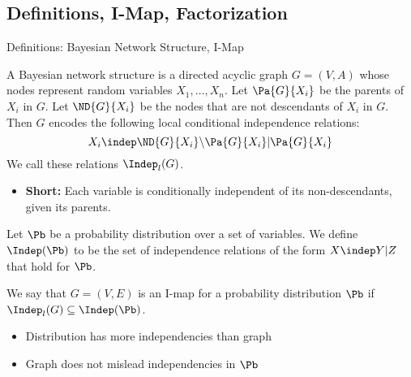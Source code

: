 \subsection{Definitions, I-Map, Factorization}
\begin{frame}{Definitions: Bayesian Network Structure, I-Map}
\begin{definition}
    A Bayesian network structure is a directed acyclic graph $G = (V,A)$ whose nodes represent random variables $X_1,\ldots, X_n$.
    Let $\Pa{G}{X_i}$ be the parents of $X_i$ in $G$.
    Let $\ND{G}{X_i}$ be the nodes that are not descendants of $X_i$ in $G$.
    Then $G$ encodes the following local conditional independence relations:
    \begin{equation}
X_i \indep \ND{G}{X_i} \backslash \Pa{G}{X_i} | \Pa{G}{X_i}
    \end{equation}
    We call these relations $\Indep_l(G)$.
\end{definition}
\pause
\begin{itemize}
    \item \textbf{Short:} Each variable is conditionally independent of its non-descendants, given its parents.
\end{itemize}
    \pause
\begin{definition}
    Let $\Pb$ be a probability distribution over a set of variables.
    We define $\Indep(\Pb)$ to be the set of independence relations of the form $X \indep Y | Z$ that hold for $\Pb$.
\end{definition}
    \pause
\begin{definition}[I-map]
    We say that $G=(V,E)$ is an I-map for a probability distribution $\Pb$ if $\Indep_l(G) \subseteq \Indep(\Pb)$.
\end{definition}
\begin{itemize}
\item Distribution has more independencies than graph
\item Graph does not mislead independencies in $\Pb$
\end{itemize}
\end{frame}

